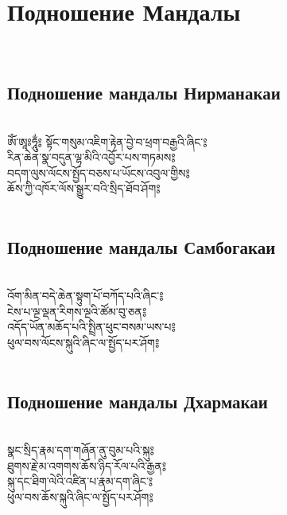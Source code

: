 \section{Подношение Мандалы}
\\
\subsection*{Подношение мандалы Нирманакаи}
\\
\ti
ཨོཾ་ཨཱཿཧཱུྂ༔ སྟོང་གསུམ་འཇིག་རྟེན་བྱེ་བ་ཕྲག་བརྒྱའི་ཞིང་༔\\
རིན་ཆེན་སྣ་བདུན་ལྷ་མིའི་འབྱོར་པས་གཏམས༔ \\
བདག་ལུས་ལོངས་སྤྱོད་བཅས་པ་ཡོངས་འབུལ་གྱིས༔ \\
ཆོས་ཀྱི་འཁོར་ལོས་སྒྱུར་བའི་སྲིད་ཐོབ་ཤོག༔ \\
\\
\ru
\subsection*{Подношение мандалы Самбогакаи}
\\
\ti
འོག་མིན་བདེ་ཆེན་སྟུག་པོ་བཀོད་པའི་ཞིང་༔ \\
ངེས་པ་ལྔ་ལྡན་རིགས་ལྔའི་ཚོམ་བུ་ཅན༔  \\
འདོད་ཡོན་མཆོད་པའི་སྤྲིན་ཕུང་བསམ་ཡས་པ༔ \\
ཕུལ་བས་ལོངས་སྐུའི་ཞིང་ལ་སྤྱོད་པར་ཤོག༔ \\
\\
\ru
\subsection*{Подношение мандалы Дхармакаи}
\\
\ti
སྣང་སྲིད་རྣམ་དག་གཞོན་ནུ་བུམ་པའི་སྐུ༔ \\
ཐུགས་རྗེ་མ་འགགས་ཆོས་ཉིད་རོལ་པའི་རྒྱན༔\\
སྐུ་དང་ཐིག་ལེའི་འཛིན་པ་རྣམ་དག་ཞིང་༔\\
ཕུལ་བས་ཆོས་སྐུའི་ཞིང་ལ་སྤྱོད་པར་ཤོག༔\\
\\
